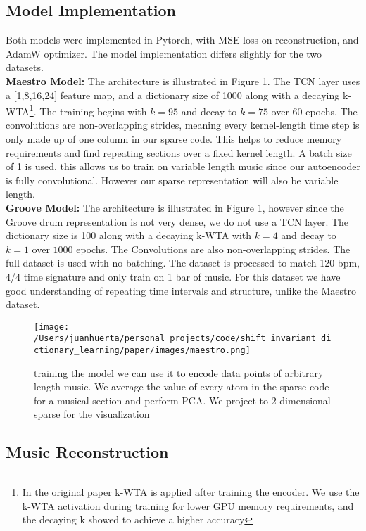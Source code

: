 \documentclass[11pt,a4paper]{article}
\begin{document}
\subsection{Model Implementation}
Both models were implemented in Pytorch, with MSE loss on reconstruction, and AdamW optimizer. The model implementation differs slightly for the two datasets. 
 \\
\textbf{Maestro Model: } The architecture is illustrated in Figure 1. The TCN layer uses a [1,8,16,24] feature map, and a dictionary size of 1000 along with a decaying k-WTA\footnote{In the original paper k-WTA is applied after training the encoder. We use the k-WTA activation during training for lower GPU memory requirements, and the decaying k showed to achieve a higher accuracy}. The training begins with $k=95$ and decay to $k=75$ over $60$ epochs. The convolutions are non-overlapping strides, meaning every kernel-length time step is only made up of one column in our sparse code. This helps to reduce memory requirements and find repeating sections over a fixed kernel length. A batch size of 1 is used, this allows us to train on variable length music since our autoencoder is fully convolutional. However our sparse representation will also be variable length. \\ 
\textbf{Groove Model: } The architecture is illustrated in Figure 1, however since the Groove drum representation is not very dense, we do not use a TCN layer. The  dictionary size is 100 along with a decaying k-WTA with $k=4$ and decay to $k=1$ over $1000$ epochs. The Convolutions are  also non-overlapping strides. The full dataset is used with no batching. The dataset is processed to match 120 bpm, 4/4 time signature and only train on 1 bar of music.  For this dataset we have good understanding of repeating time intervals and structure, unlike the Maestro dataset. 


\begin{figure*}[ht]
  \texttt{[image: /Users/juanhuerta/personal\_projects/code/shift\_invariant\_dictionary\_learning/paper/images/maestro.png]}
  \caption{ training the model we can use it to encode data points of arbitrary length music. We average the value of every atom in the sparse code for a musical section and perform PCA. We project to 2 dimensional sparse for the visualization }
  \label{fig:boat2}
\end{figure*}


\subsection{Music Reconstruction}
\label{ssec:first}
\end{document}

